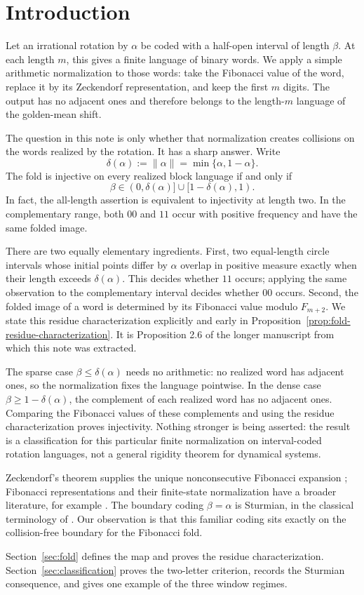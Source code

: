 \section{Introduction}

Let an irrational rotation by \(\alpha\) be coded with a half-open interval
of length \(\beta\).  At each length \(m\), this gives a finite language of
binary words.  We apply a simple arithmetic normalization to those words:
take the Fibonacci value of the word, replace it by its Zeckendorf
representation, and keep the first \(m\) digits.  The output has no adjacent
ones and therefore belongs to the length-\(m\) language of the golden-mean
shift.

The question in this note is only whether that normalization creates
collisions on the words realized by the rotation.  It has a sharp answer.
Write
\[
\delta(\alpha):=\|\alpha\|=\min\{\alpha,1-\alpha\}.
\]
The fold is injective on every realized block language if and only if
\[
\beta\in(0,\delta(\alpha)]\cup[1-\delta(\alpha),1).
\]
In fact, the all-length assertion is equivalent to injectivity at length
two.  In the complementary range, both \(00\) and \(11\) occur with positive
frequency and have the same folded image.

There are two equally elementary ingredients.  First, two equal-length
circle intervals whose initial points differ by \(\alpha\) overlap in
positive measure exactly when their length exceeds \(\delta(\alpha)\).
This decides whether \(11\) occurs; applying the same observation to the
complementary interval decides whether \(00\) occurs.  Second, the folded
image of a word is determined by its Fibonacci value modulo \(F_{m+2}\).
We state this residue characterization explicitly and early in
Proposition~\ref{prop:fold-residue-characterization}.  It is Proposition
2.6 of the longer manuscript from which this note was extracted.

The sparse case \(\beta\leq\delta(\alpha)\) needs no arithmetic: no realized
word has adjacent ones, so the normalization fixes the language pointwise.
In the dense case \(\beta\geq1-\delta(\alpha)\), the complement of each
realized word has no adjacent ones.  Comparing the Fibonacci values of
these complements and using the residue characterization proves
injectivity.  Nothing stronger is being asserted: the result is a
classification for this particular finite normalization on interval-coded
rotation languages, not a general rigidity theorem for dynamical systems.

Zeckendorf's theorem supplies the unique nonconsecutive Fibonacci expansion
\cite{Zeckendorf1972}; Fibonacci representations and their finite-state
normalization have a broader literature, for example
\cite{Frougny1991FibonacciFiniteAutomata}.  The boundary coding
\(\beta=\alpha\) is Sturmian, in the classical terminology of
\cite{MorseHedlund1940}.  Our observation is that this familiar coding sits
exactly on the collision-free boundary for the Fibonacci fold.

Section~\ref{sec:fold} defines the map and proves the residue
characterization.  Section~\ref{sec:classification} proves the two-letter
criterion, records the Sturmian consequence, and gives one example of the
three window regimes.
